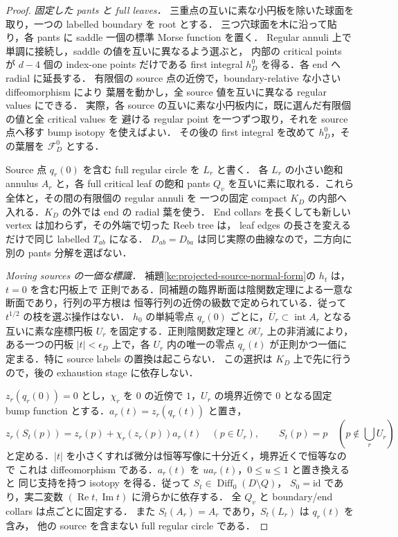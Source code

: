 \begin{proof}
\emph{固定した pants と full leaves．}
三重点の互いに素な小円板を除いた球面を取り，一つの labelled boundary を root とする．
三つ穴球面を木に沿って貼り，各 pants に saddle 一個の標準 Morse function を置く．
Regular annuli 上で単調に接続し，saddle の値を互いに異なるよう選ぶと，
内部の critical points が $d-4$ 個の index-one points だけである first integral
$h_D^0$ を得る．各 end へ radial に延長する．
有限個の source 点の近傍で，boundary-relative な小さい diffeomorphism により
葉層を動かし，全 source 値を互いに異なる regular values にできる．
実際，各 source の互いに素な小円板内に，既に選んだ有限個の値と全 critical values を
避ける regular point を一つずつ取り，それを source 点へ移す bump isotopy を使えばよい．
その後の first integral を改めて $h_D^0$，その葉層を $\mathcal F_D^0$ とする．

Source 点 $q_r(0)$ を含む full regular circle を $L_r$ と書く．
各 $L_r$ の小さい飽和 annulus $A_r$ と，各 full critical leaf の飽和 pants
$Q_v$ を互いに素に取れる．これら全体と，その間の有限個の regular annuli を
一つの固定 compact $K_D$ の内部へ入れる．$K_D$ の外では end の radial 葉を使う．
End collars を長くしても新しい vertex は加わらず，その外端で切った Reeb tree は，
leaf edges の長さを変えるだけで同じ labelled $T_{ab}$ になる．
$D_{ab}=D_{ba}$ は同じ実際の曲線なので，二方向に別の pants 分解を選ばない．

\emph{Moving sources の一価な標識．}
補題\ref{ke:projected-source-normal-form}の $h_t$ は，$t=0$ を含む円板上で
正則である．同補題の臨界断面は陰関数定理による一意な断面であり，行列の平方根は
恒等行列の近傍の級数で定められている．従って $t^{1/2}$ の枝を選ぶ操作はない．
$h_0$ の単純零点 $q_r(0)$ ごとに，$\overline U_r\subset\operatorname{int}A_r$ となる
互いに素な座標円板 $U_r$ を固定する．正則陰関数定理と $\partial U_r$ 上の非消滅により，
ある一つの円板 $|t|<\epsilon_D$ 上で，各 $U_r$ 内の唯一の零点
$q_r(t)$ が正則かつ一価に定まる．特に source labels の置換は起こらない．
この選択は $K_D$ 上で先に行うので，後の exhaustion stage に依存しない．

$z_r(q_r(0))=0$ とし，$\chi_r$ を $0$ の近傍で $1$，$U_r$ の境界近傍で
$0$ となる固定 bump function とする．$a_r(t)=z_r(q_r(t))$ と置き，
\[
 z_r(S_t(p))=z_r(p)+\chi_r(z_r(p))a_r(t)\quad(p\in U_r),
 \qquad S_t(p)=p\quad(p\notin\textstyle\bigcup_r U_r)
\]
と定める．$|t|$ を小さくすれば微分は恒等写像に十分近く，境界近くで恒等なので
これは diffeomorphism である．$a_r(t)$ を $u a_r(t)$，$0\le u\le1$ と置き換えると
同じ支持を持つ isotopy を得る．従って $S_t\in\operatorname{Diff}_0(D\setminus Q)$，
$S_0=\mathrm{id}$ であり，実二変数 $(\operatorname{Re}t,\operatorname{Im}t)$ に滑らかに依存する．
全 $Q_v$ と boundary/end collars は点ごとに固定する．
また $S_t(A_r)=A_r$ であり，$S_t(L_r)$ は $q_r(t)$ を含み，
他の source を含まない full regular circle である．


\end{proof}
